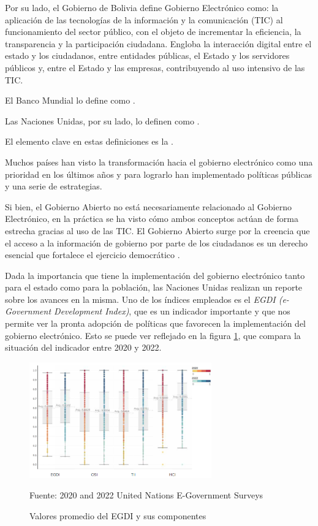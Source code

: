 Por su lado, el Gobierno de Bolivia define Gobierno Electrónico como: la aplicación de las tecnologías de la información y la comunicación (TIC) al funcionamiento del sector público, con el objeto de incrementar la eficiencia, la transparencia y la participación ciudadana.
Engloba la interacción digital entre el estado y los ciudadanos, entre entidades públicas, el Estado y los servidores públicos y, entre el Estado y las empresas, contribuyendo al uso intensivo de las TIC.

El Banco Mundial lo define como .

Las Naciones Unidas, por su lado, lo definen como .

El elemento clave en estas definiciones es la .

Muchos países han visto la transformación hacia el gobierno electrónico como una prioridad en los últimos años y para lograrlo han implementado políticas públicas y una serie de estrategias.

Si bien, el Gobierno Abierto no está necesariamente relacionado al Gobierno Electrónico, en la práctica se ha visto cómo ambos conceptos actúan de forma estrecha gracias al uso de las TIC. El Gobierno Abierto surge por la creencia que el acceso a la información de gobierno por parte de los ciudadanos es un derecho esencial que fortalece el ejercicio democrático \cite[13]{naserGobiernoElectronicoGestion2011}.

Dada la importancia que tiene la implementación del gobierno electrónico tanto para el estado como para la población, las Naciones Unidas realizan un reporte sobre los avances en la misma. Uno de los índices empleados es el \textit{EGDI (e-Government Development Index)}, que es un indicador importante y que nos permite ver la pronta adopción de políticas que favorecen la implementación del gobierno electrónico. Esto se puede ver reflejado en la figura \ref{fig:egdi2020_2022}, que compara la situación del indicador entre 2020 y 2022.

\begin{figure}[!htpb]
    \centering
    \includegraphics[width=0.7\textwidth]{assets/egdi2020_2022}
    \caption{Valores promedio del EGDI y sus componentes}{Fuente: 2020 and 2022 United Nations E-Government Surveys}
    \label{fig:egdi2020_2022}
\end{figure}

